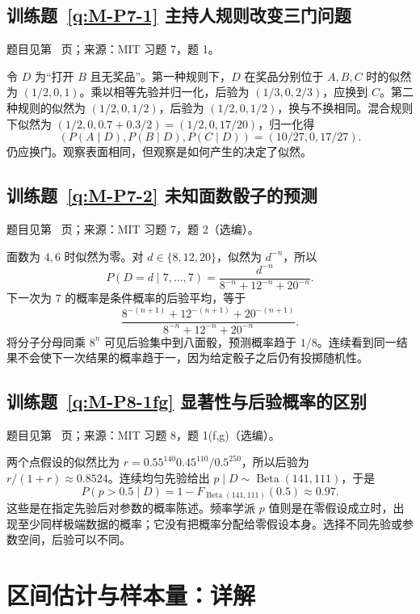\subsection*{训练题~\ref{q:M-P7-1} 主持人规则改变三门问题}\label{a:M-P7-1}{\small 题目见第~\pageref{q:M-P7-1} 页；来源：MIT 习题 7，题 1。}
\begin{solve}令 $D$ 为“打开 $B$ 且无奖品”。第一种规则下，$D$ 在奖品分别位于 $A,B,C$ 时的似然为 $(1/2,0,1)$。乘以相等先验并归一化，后验为 $(1/3,0,2/3)$，应换到 $C$。第二种规则的似然为 $(1/2,0,1/2)$，后验为 $(1/2,0,1/2)$，换与不换相同。混合规则下似然为 $(1/2,0,0.7+0.3/2)=(1/2,0,17/20)$，归一化得\[(P(A\mid D),P(B\mid D),P(C\mid D))=(10/27,0,17/27).\]仍应换门。观察表面相同，但观察是如何产生的决定了似然。\end{solve}

\subsection*{训练题~\ref{q:M-P7-2} 未知面数骰子的预测}\label{a:M-P7-2}{\small 题目见第~\pageref{q:M-P7-2} 页；来源：MIT 习题 7，题 2（选编）。}
\begin{solve}面数为 $4,6$ 时似然为零。对 $d\in\{8,12,20\}$，似然为 $d^{-n}$，所以\[P(D=d\mid7,\ldots,7)=\frac{d^{-n}}{8^{-n}+12^{-n}+20^{-n}}.\]下一次为 $7$ 的概率是条件概率的后验平均，等于\[\frac{8^{-(n+1)}+12^{-(n+1)}+20^{-(n+1)}}{8^{-n}+12^{-n}+20^{-n}}.\]将分子分母同乘 $8^n$ 可见后验集中到八面骰，预测概率趋于 $1/8$。连续看到同一结果不会使下一次结果的概率趋于一，因为给定骰子之后仍有投掷随机性。\end{solve}

\subsection*{训练题~\ref{q:M-P8-1fg} 显著性与后验概率的区别}\label{a:M-P8-1fg}{\small 题目见第~\pageref{q:M-P8-1fg} 页；来源：MIT 习题 8，题 1(f,g)（选编）。}
\begin{solve}两个点假设的似然比为 $r=0.55^{140}0.45^{110}/0.5^{250}$，所以后验为 $r/(1+r)\approx0.8524$。连续均匀先验给出 $p\mid D\sim\operatorname{Beta}(141,111)$，于是\[P(p>0.5\mid D)=1-F_{\operatorname{Beta}(141,111)}(0.5)\approx0.97.\]这些是在指定先验后对参数的概率陈述。频率学派 $p$ 值则是在零假设成立时，出现至少同样极端数据的概率；它没有把概率分配给零假设本身。选择不同先验或参数空间，后验可以不同。\end{solve}

\clearpage\section*{区间估计与样本量：详解}


